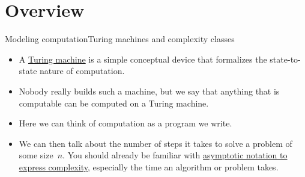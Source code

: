 
\section{Overview}

\begin{frame}{Modeling computation}{Turing machines and complexity classes}
\begin{itemize}
    \item A \href{https://en.wikipedia.org/wiki/Turing_machine}{Turing machine} is a simple conceptual device that formalizes the state-to-state nature of computation.
    \item Nobody really builds such a machine, but we say that anything that is computable can be computed on a Turing machine.   
    \item<3-> Here we can think of computation as a program we write. 
    \item<4-> We can then talk about the number of steps it takes to solve a problem of some size~$n$.  You should already be familiar with \href{https://en.wikipedia.org/wiki/Asymptotic_computational_complexity}{asymptotic notation to express complexity}, especially the time an algorithm or problem takes.
\end{itemize}

    
\end{frame}

